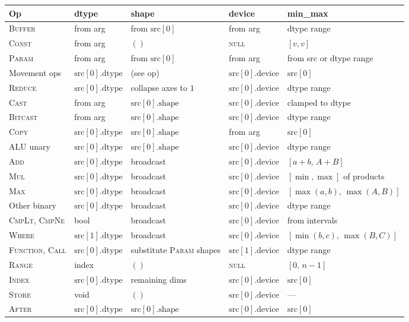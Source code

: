 \documentclass[10pt,letterpaper]{article}
\newcommand{\op}[1]{\textsc{#1}}
\begin{document}
\medskip
\begin{tabular}{@{}l l l l l@{}}
\toprule
\textbf{Op} & \textbf{dtype} & \textbf{shape} & \textbf{device} & \textbf{min\_max} \\
\midrule
\op{Buffer} & from arg & from $\mathrm{src}[0]$ & from arg & dtype range \\
\op{Const} & from arg & $()$ & \textsc{null} & $[v, v]$ \\
\op{Param} & from arg & from $\mathrm{src}[0]$ & from arg & from src or dtype range \\[3pt]
Movement ops & $\mathrm{src}[0].\mathrm{dtype}$ & (see op) & $\mathrm{src}[0].\mathrm{device}$ & $\mathrm{src}[0]$ \\
\op{Reduce} & $\mathrm{src}[0].\mathrm{dtype}$ & collapse axes to $1$ & $\mathrm{src}[0].\mathrm{device}$ & dtype range \\[3pt]
\op{Cast} & from arg & $\mathrm{src}[0].\mathrm{shape}$ & $\mathrm{src}[0].\mathrm{device}$ & clamped to dtype \\
\op{Bitcast} & from arg & $\mathrm{src}[0].\mathrm{shape}$ & $\mathrm{src}[0].\mathrm{device}$ & dtype range \\
\op{Copy} & $\mathrm{src}[0].\mathrm{dtype}$ & $\mathrm{src}[0].\mathrm{shape}$ & from arg & $\mathrm{src}[0]$ \\
ALU unary & $\mathrm{src}[0].\mathrm{dtype}$ & $\mathrm{src}[0].\mathrm{shape}$ & $\mathrm{src}[0].\mathrm{device}$ & dtype range \\
\op{Add} & $\mathrm{src}[0].\mathrm{dtype}$ & broadcast & $\mathrm{src}[0].\mathrm{device}$ & $[a+b,\, A+B]$ \\
\op{Mul} & $\mathrm{src}[0].\mathrm{dtype}$ & broadcast & $\mathrm{src}[0].\mathrm{device}$ & $[\min,\max]$ of products \\
\op{Max} & $\mathrm{src}[0].\mathrm{dtype}$ & broadcast & $\mathrm{src}[0].\mathrm{device}$ & $[\max(a,b),\, \max(A,B)]$ \\
Other binary & $\mathrm{src}[0].\mathrm{dtype}$ & broadcast & $\mathrm{src}[0].\mathrm{device}$ & dtype range \\
\op{CmpLt}, \op{CmpNe} & bool & broadcast & $\mathrm{src}[0].\mathrm{device}$ & from intervals \\
\op{Where} & $\mathrm{src}[1].\mathrm{dtype}$ & broadcast & $\mathrm{src}[0].\mathrm{device}$ & $[\min(b,c),\, \max(B,C)]$ \\[3pt]
\op{Function}, \op{Call} & $\mathrm{src}[0].\mathrm{dtype}$ & substitute \op{Param} shapes & $\mathrm{src}[1].\mathrm{device}$ & dtype range \\
\op{Range} & index & $()$ & \textsc{null} & $[0,\, n{-}1]$ \\
\op{Index} & $\mathrm{src}[0].\mathrm{dtype}$ & remaining dims & $\mathrm{src}[0].\mathrm{device}$ & $\mathrm{src}[0]$ \\
\op{Store} & void & $()$ & $\mathrm{src}[0].\mathrm{device}$ & --- \\
\op{After} & $\mathrm{src}[0].\mathrm{dtype}$ & $\mathrm{src}[0].\mathrm{shape}$ & $\mathrm{src}[0].\mathrm{device}$ & $\mathrm{src}[0]$ \\
\bottomrule
\end{tabular}
\end{document}
